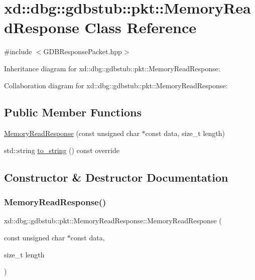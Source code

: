\hypertarget{classxd_1_1dbg_1_1gdbstub_1_1pkt_1_1_memory_read_response}{}\section{xd\+:\+:dbg\+:\+:gdbstub\+:\+:pkt\+:\+:Memory\+Read\+Response Class Reference}
\label{classxd_1_1dbg_1_1gdbstub_1_1pkt_1_1_memory_read_response}


{\ttfamily \#include $<$G\+D\+B\+Response\+Packet.\+hpp$>$}



Inheritance diagram for xd\+:\+:dbg\+:\+:gdbstub\+:\+:pkt\+:\+:Memory\+Read\+Response\+:


Collaboration diagram for xd\+:\+:dbg\+:\+:gdbstub\+:\+:pkt\+:\+:Memory\+Read\+Response\+:
\subsection*{Public Member Functions}
\begin{DoxyCompactItemize}
\item 
\mbox{\hyperlink{classxd_1_1dbg_1_1gdbstub_1_1pkt_1_1_memory_read_response_a69f49c89550c7613cf4481e419594138}{Memory\+Read\+Response}} (const unsigned char $\ast$const data, size\+\_\+t length)
\item 
std\+::string \mbox{\hyperlink{classxd_1_1dbg_1_1gdbstub_1_1pkt_1_1_memory_read_response_aedaabcefd9d9d5e5182c110f7321be6e}{to\+\_\+string}} () const override
\end{DoxyCompactItemize}


\subsection{Constructor \& Destructor Documentation}
\mbox{\label{classxd_1_1dbg_1_1gdbstub_1_1pkt_1_1_memory_read_response_a69f49c89550c7613cf4481e419594138}} 
\subsubsection{\texorpdfstring{Memory\+Read\+Response()}{MemoryReadResponse()}}
{\footnotesize\ttfamily xd\+::dbg\+::gdbstub\+::pkt\+::\+Memory\+Read\+Response\+::\+Memory\+Read\+Response (\begin{DoxyParamCaption}\item[{const unsigned char $\ast$const}]{data,  }\item[{size\+\_\+t}]{length }\end{DoxyParamCaption})\hspace{0.3cm}{\ttfamily [inline]}}



